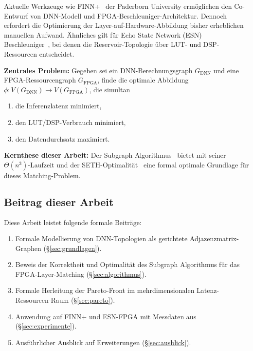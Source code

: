 ﻿\documentclass[a4paper,12pt]{article}
\theoremstyle{definition}
\begin{document}
Aktuelle Werkzeuge wie FINN+~\cite{jentzsch2025} der Paderborn University ermöglichen
den Co-Entwurf von DNN-Modell und FPGA-Beschleuniger-Architektur.
Dennoch erfordert die Optimierung der Layer-auf-Hardware-Abbildung bisher erheblichen
manuellen Aufwand. Ähnliches gilt für Echo State Network (ESN) Beschleuniger~\cite{jafari2025},
bei denen die Reservoir-Topologie über LUT- und DSP-Ressourcen entscheidet.

\textbf{Zentrales Problem:} Gegeben sei ein DNN-Berechnungsgraph $G_{\text{DNN}}$
und eine FPGA-Ressourcengraph $G_{\text{FPGA}}$, finde die optimale Abbildung
$\phi: V(G_{\text{DNN}}) \to V(G_{\text{FPGA}})$, die simultan
\begin{enumerate}
    \item die Inferenzlatenz minimiert,
    \item den LUT/DSP-Verbrauch minimiert,
    \item den Datendurchsatz maximiert.
\end{enumerate}

\textbf{Kernthese dieser Arbeit:} Der Subgraph Algorithmus~\cite{epp2026a} bietet mit
seiner $\Theta(n^3)$-Laufzeit und der SETH-Optimalität~\cite{epp2026b} eine formal
optimale Grundlage für dieses Matching-Problem.

\subsection{Beitrag dieser Arbeit}

Diese Arbeit leistet folgende formale Beiträge:
\begin{enumerate}
    \item Formale Modellierung von DNN-Topologien als gerichtete Adjazenzmatrix-Graphen
          (\S\ref{sec:grundlagen}).
    \item Beweis der Korrektheit und Optimalität des Subgraph Algorithmus für das
          FPGA-Layer-Matching (\S\ref{sec:algorithmus}).
    \item Formale Herleitung der Pareto-Front im mehrdimensionalen
          Latenz-Ressourcen-Raum (\S\ref{sec:pareto}).
    \item Anwendung auf FINN+ und ESN-FPGA mit Messdaten aus~\cite{jentzsch2025, jafari2025}
          (\S\ref{sec:experimente}).
    \item Ausführlicher Ausblick auf Erweiterungen (\S\ref{sec:ausblick}).
\end{enumerate}

\end{document}
